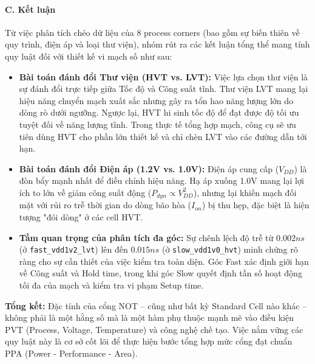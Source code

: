 \documentclass[12pt, a4paper, oneside]{article}
\begin{document}
\paragraph{C. Kết luận} 

Từ việc phân tích chéo dữ liệu của 8 process corners (bao gồm sự biến thiên về quy trình, điện áp và loại thư viện), nhóm rút ra các kết luận tổng thể mang tính quy luật đối với thiết kế vi mạch số như sau:

\begin{itemize}
    \item \textbf{Bài toán đánh đổi Thư viện (HVT vs. LVT):} Việc lựa chọn thư viện là sự đánh đổi trực tiếp giữa Tốc độ và Công suất tĩnh. Thư viện LVT mang lại hiệu năng chuyển mạch xuất sắc nhưng gây ra tổn hao năng lượng lớn do dòng rò dưới ngưỡng. Ngược lại, HVT hi sinh tốc độ để đạt được độ tối ưu tuyệt đối về năng lượng tĩnh. Trong thực tế tổng hợp mạch, công cụ sẽ ưu tiên dùng HVT cho phần lớn thiết kế và chỉ chèn LVT vào các đường dẫn tới hạn.
    
    \item \textbf{Bài toán đánh đổi Điện áp (1.2V vs. 1.0V):} Điện áp cung cấp ($V_{DD}$) là đòn bẩy mạnh nhất để điều chỉnh hiệu năng. Hạ áp xuống 1.0V mang lại lợi ích to lớn về giảm công suất động ($P_{dyn} \propto V_{DD}^2$), nhưng lại khiến mạch đối mặt với rủi ro trễ thời gian do dòng bão hòa ($I_{on}$) bị thu hẹp, đặc biệt là hiện tượng "đói dòng" ở các cell HVT.
    
    \item \textbf{Tầm quan trọng của phân tích đa góc:} Sự chênh lệch độ trễ từ $0.002ns$ (ở \texttt{fast\_vdd1v2\_lvt}) lên đến $0.015ns$ (ở \texttt{slow\_vdd1v0\_hvt}) minh chứng rõ ràng cho sự cần thiết của việc kiểm tra toàn diện. Góc Fast xác định giới hạn về Công suất và Hold time, trong khi góc Slow quyết định tần số hoạt động tối đa của mạch và kiểm tra vi phạm Setup time.
\end{itemize}

\textbf{Tổng kết:} Đặc tính của cổng NOT – cũng như bất kỳ Standard Cell nào khác – không phải là một hằng số mà là một hàm phụ thuộc mạnh mẽ vào điều kiện PVT (Process, Voltage, Temperature) và công nghệ chế tạo. Việc nắm vững các quy luật này là cơ sở cốt lõi để thực hiện bước tổng hợp mức cổng đạt chuẩn PPA (Power - Performance - Area).

\newpage
\end{document}
